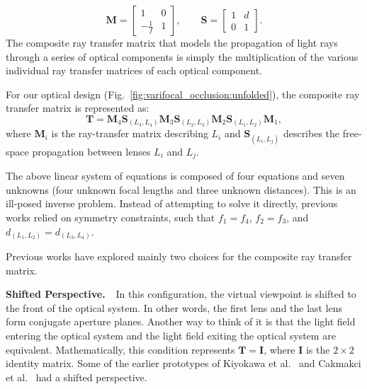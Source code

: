 %
\begin{equation}
\mathbf{M} = 
\begin{bmatrix}
1 & 0 \\
-\frac{1}{f} & 1 
\end{bmatrix},
\quad \quad
\mathbf{S} = 
\begin{bmatrix}
1 & d \\
0 & 1 
\end{bmatrix}.
\end{equation}
%
The composite ray transfer matrix that models the propagation of light rays through a series of optical components is simply the multiplication of the various individual ray transfer matrices of each optical component. 

For our optical design (Fig.~\ref{fig:varifocal_occlusion:unfolded}), the composite ray transfer matrix is represented as:
%
\begin{equation}
\mathbf{T} = \mathbf{M}_4 \mathbf{S}_{(L_3,L_4)} \mathbf{M}_3 \mathbf{S}_{(L_2,L_3)} \mathbf{M}_2 \mathbf{S}_{(L_1,L_2)} \mathbf{M}_1,
\label{eq:static_general}
\end{equation}
%
where $\mathbf{M}_i$ is the ray-transfer matrix describing $L_i$ and $\mathbf{S}_{(L_i,L_j)}$ describes the free-space propagation between lenses $L_i$ and $L_j$.

The above linear system of equations is composed of four equations and seven unknowns (four unknown focal lengths and three unknown distances). This is an ill-posed inverse problem. Instead of attempting to solve it directly, previous works relied on symmetry constraints, such that $f_1 = f_4$, $f_2 = f_3$, and $d_{(L_1,L_2)} = d_{(L_3,L_4)}$.

%
%

Previous works have explored mainly two choices for the composite ray transfer matrix. 

{\bf Shifted Perspective. $\,\,$}
In this configuration, the virtual viewpoint is shifted to the front of the optical system. In other words, the first lens and the last lens form conjugate aperture planes. Another way to think of it is that the light field entering the optical system and the light field exiting the optical system are equivalent. Mathematically, this condition represents $\mathbf{T} = \mathbf{I}$, where $\mathbf{I}$ is the $2 \times 2$ identity matrix. Some of the earlier prototypes of Kiyokawa et al.~\cite{Kiyokawa2000,Kiyokawa2001} and Cakmakci et al.~\cite{Cakmakci2004} had a shifted perspective. 

